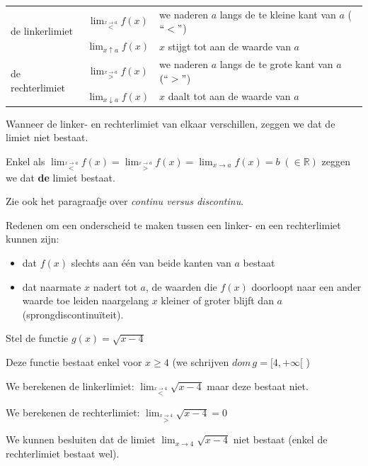 \begin{center}
	\begin{tabular}{lcl}
	\multirow{2}{*}{de linkerlimiet} & $\lim_{\overset{x\rightarrow a}{<}}f(x)$ & we naderen $a$ langs de te kleine kant van $a$ ($\lyxmathsym{\textquotedblleft}<\lyxmathsym{\textquotedblright}$)\\
	& $\lim_{x\uparrow a}f(x)$ & $x$ stijgt tot aan de waarde van $a$\\
	\multirow{2}{*}{de rechterlimiet} & $\lim_{\overset{x\rightarrow a}{>}}f(x)$ & we naderen $a$ langs de te grote kant van $a$ $(\lyxmathsym{\textquotedblleft}>\lyxmathsym{\textquotedblright}$)\\
	& $\lim_{x\downarrow a}f(x)$ & $x$ daalt tot aan de waarde van $a$\\
\end{tabular}
\end{center}

Wanneer de linker- en rechterlimiet van elkaar verschillen,
zeggen we dat de limiet niet bestaat. 

Enkel als $\lim_{\overset{x\rightarrow a}{<}}f(x)=\lim_{\overset{x\rightarrow a}{>}}f(x)=\lim_{x\to a}f(x)=b\;(\in\mathbb{R})$
zeggen we dat \textbf{de} limiet bestaat.

Zie ook het paragraafje over \emph{continu versus discontinu}.

Redenen om een onderscheid te maken tussen een linker- en
een rechterlimiet kunnen zijn:
\begin{itemize}
\item dat $f(x)$ slechts aan \'e\'en van beide kanten van $a$ bestaat
\item dat naarmate $x$ nadert tot $a$, de waarden die $f(x)$ doorloopt
naar een ander waarde toe leiden naargelang $x$ kleiner of groter
blijft dan $a$ (sprongdiscontinu\"iteit).
\end{itemize}

\begin{voorbeeld}
	
Stel de functie $g(x)=\sqrt{x-4}$



\begin{figure}[H]
	\centering
	
\end{figure}

Deze functie bestaat enkel voor $x\geq4$ (we schrijven $dom\,g=[4,+\infty[$
)

We berekenen de linkerlimiet: $\lim_{\overset{x\rightarrow4}{<}}\sqrt{x-4}$
maar deze bestaat niet.

We berekenen de rechterlimiet: $\lim_{\overset{x\rightarrow4}{>}}\sqrt{x-4}=0$ 

We kunnen besluiten dat de limiet $\lim_{x\to4}\sqrt{x-4}$
niet bestaat (enkel de rechterlimiet bestaat wel).

\end{voorbeeld}

